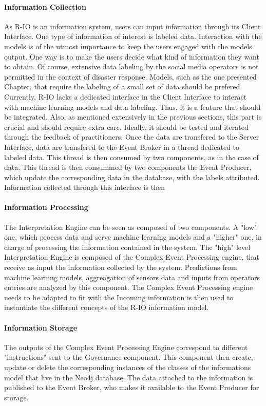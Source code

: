 \paragraph{Information Collection}
As R-IO is an information system, users can input information through its Client Interface.
One type of information of interest is labeled data.
Interaction with the models is of the utmost importance to keep the users engaged with the models output.
One way is to make the users decide what kind of information they want to obtain.
Of course, extensive data labeling by the social media operators is not permitted in the context of disaster response.
Models, such as the one presented Chapter, that require the labeling of a small set of data should be prefered.
Currently, R-IO lacks a dedicated interface in the Client Interface to interact with machine learning models and data labeling.
Thus, it is a feature that should be integrated.
Also, as mentioned extensively in the previous sections, this part is crucial and should require extra care.
Ideally, it should be tested and iterated through the feedback of practitioners.
Once the data are transfered to the Server Interface, data are transfered to the Event Broker in a thread dedicated to labeled data.
This thread is then consumed by two components, as in the case of data.
This thread is then consummed by two components the Event Producer, which update the corresponding data in the database, with the labels attributed.
Information collected through this interface is then
\paragraph{Information Processing}
The Interpretation Engine can be seen as composed of two components.
A "low" one, which process data and serve machine learning models and a "higher" one, in charge of processing the information contained in the system.
The "high" level Interpretation Engine is composed of the Complex Event Processing engine, that receive as input the information collected by the system.
Predictions from machine learning models, aggreagation of sensors data and inputs from operators entries are analyzed by this component.
The Complex Event Processing engine needs to be adapted to fit with the
Incoming information is then used to instantiate the different concepts of the R-IO information model.
\paragraph{Information Storage}
The outputs of the Complex Event Processing Engine correspond to different "instructions" sent to the Governance component.
This component then create, update or delete the corresponding instances of the classes of the informations model that live in the Neo4j database.
The data attached to the information is published to the Event Broker, who makes it available to the Event Producer for storage.

